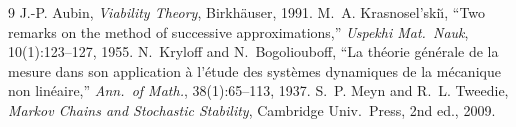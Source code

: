 \documentclass[11pt]{article}
\begin{document}
\begin{thebibliography}{9}
 J.-P. Aubin, \emph{Viability Theory}, Birkh\"auser, 1991.
 M.~A. Krasnosel'ski\u{\i}, ``Two remarks on the method of
successive approximations,'' \emph{Uspekhi Mat.\ Nauk}, 10(1):123--127, 1955.
 N.~Kryloff and N.~Bogoliouboff, ``La th\'eorie g\'en\'erale de
la mesure dans son application \`a l'\'etude des syst\`emes dynamiques de la
m\'ecanique non lin\'eaire,'' \emph{Ann.\ of Math.}, 38(1):65--113, 1937.
 S.~P. Meyn and R.~L. Tweedie, \emph{Markov Chains and Stochastic
Stability}, Cambridge Univ.\ Press, 2nd ed., 2009.
\end{thebibliography}
\end{document}
